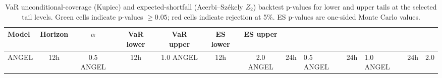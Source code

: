 \begin{table}[ht]
\centering
\small
\setlength{\tabcolsep}{6pt}
\begin{tabular}{l c c c c c c}
\toprule
Model & Horizon & $\alpha$ & VaR lower & VaR upper & ES lower & ES upper \\
\midrule
ANGEL & 12h & 0.5%
ANGEL & 12h & 1.0%
ANGEL & 12h & 2.0%
\midrule
ANGEL & 24h & 0.5%
ANGEL & 24h & 1.0%
ANGEL & 24h & 2.0%
\midrule
\bottomrule
\end{tabular}
\caption{VaR unconditional-coverage (Kupiec) and expected-shortfall (Acerbi--Sz\'ekely $Z_2$) backtest p-values for lower and upper tails at the selected tail levels. Green cells indicate p-values $\geq 0.05$; red cells indicate rejection at 5\%. ES p-values are one-sided Monte Carlo values.}
\label{tab:angel_var_es_backtests}
\end{table}
